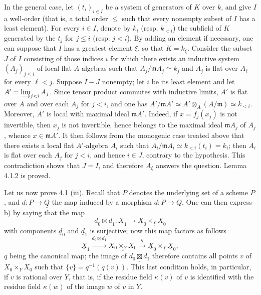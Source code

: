 In the general case, let $(t_i)_{i\in I}$ be a system of generators of $K$ over $k$, and give $I$ a well-order (that is, a total order $\leq$ such that every nonempty subset of $I$ has a least element). For every $i\in I$, denote by $k_i$ (resp. $k_{<i}$) the subfield of $K$ generated by the $t_j$ for $j\leq i$ (resp. $j<i$). By adding an element if necessary, one can suppose that $I$ has a greatest element $\xi$, so that $K=k_\xi$. Consider the subset $J$ of $I$ consisting of those indices $i$ for which there exists an inductive system $(A_j)_{j\leq i}$ of local flat $A$-algebras such that $A_j/\mathfrak mA_j\simeq k_j$ and $A_j$ is flat over $A_\ell$ for every $\ell<j$. Suppose $I-J$ nonempty; let $i$ be its least element and let $A'=\varinjlim_{j<i}A_j$. Since tensor product commutes with inductive limits, $A'$ is flat over $A$ and over each $A_j$ for $j<i$, and one has $A'/\mathfrak mA'\simeq A'\otimes_A(A/\mathfrak m)\simeq k_{<i}$. Moreover, $A'$ is local with maximal ideal $\mathfrak mA'$. Indeed, if $x=f_j(x_j)$ is not invertible, then $x_j$ is not invertible, hence belongs to the maximal ideal $\mathfrak mA_j$ of $A_j$, whence $x\in\mathfrak mA'$. It then follows from the monogenic case treated above that there exists a local flat $A'$-algebra $A_i$ such that $A_i/\mathfrak mA_i\simeq k_{<i}(t_i)=k_i$; then $A_i$ is flat over each $A_j$ for $j<i$, and hence $i\in J$, contrary to the hypothesis. This contradiction shows that $J=I$, and therefore $A_\xi$ answers the question. Lemma 4.1.2 is proved.

Let us now prove 4.1 (iii). Recall that $\underline P$ denotes the underlying set of a scheme $P$, and $\underline d:\underline P\to\underline Q$ the map induced by a morphism $d:P\to Q$. One can then express b) by saying that the map
\[
\underline d_0\boxtimes\underline d_1:\underline X_1\to\underline X_0\times_{\underline Y}\underline X_0
\]
with components $\underline d_0$ and $\underline d_1$ is surjective; now this map factors as follows
\[
\underline X_1\xrightarrow{\underline{d_0\boxtimes d_1}}\underline{X_0\times_YX_0}\xrightarrow{q}\underline X_0\times_{\underline Y}\underline X_0,
\]
$q$ being the canonical map; the image of $\underline{d_0\boxtimes d_1}$ therefore contains all points $v$ of $X_0\times_YX_0$ such that $\{v\}=q^{-1}(q(v))$. This last condition holds, in particular, if $v$ is rational over $Y$, that is, if the residue field $\kappa(v)$ of $v$ is identified with the residue field $\kappa(w)$ of the image $w$ of $v$ in $Y$.

